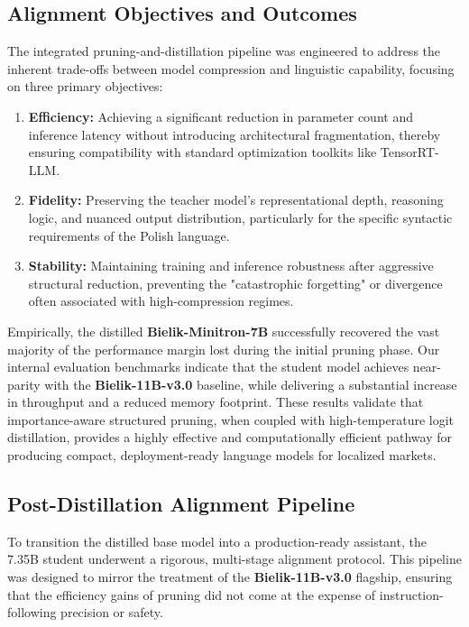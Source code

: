 \documentclass{article}
\begin{document}
\subsection{Alignment Objectives and Outcomes}
The integrated pruning-and-distillation pipeline was engineered to address the inherent trade-offs between model compression and linguistic capability, focusing on three primary objectives:
\begin{enumerate}
    \item \textbf{Efficiency:} Achieving a significant reduction in parameter count and inference latency without introducing architectural fragmentation, thereby ensuring compatibility with standard optimization toolkits like TensorRT-LLM.
    \item \textbf{Fidelity:} Preserving the teacher model's representational depth, reasoning logic, and nuanced output distribution, particularly for the specific syntactic requirements of the Polish language.
    \item \textbf{Stability:} Maintaining training and inference robustness after aggressive structural reduction, preventing the "catastrophic forgetting" or divergence often associated with high-compression regimes.
\end{enumerate}

Empirically, the distilled \textbf{Bielik-Minitron-7B} successfully recovered the vast majority of the performance margin lost during the initial pruning phase. Our internal evaluation benchmarks indicate that the student model achieves near-parity with the \textbf{Bielik-11B-v3.0} baseline, while delivering a substantial increase in throughput and a reduced memory footprint. These results validate that importance-aware structured pruning, when coupled with high-temperature logit distillation, provides a highly effective and computationally efficient pathway for producing compact, deployment-ready language models for localized markets.


\subsection{Post-Distillation Alignment Pipeline}
To transition the distilled base model into a production-ready assistant, the 7.35B student underwent a rigorous, multi-stage alignment protocol. This pipeline was designed to mirror the treatment of the \textbf{Bielik-11B-v3.0} \cite{ociepa2025bielik11bv3multilingual} flagship, ensuring that the efficiency gains of pruning did not come at the expense of instruction-following precision or safety.
\end{document}
